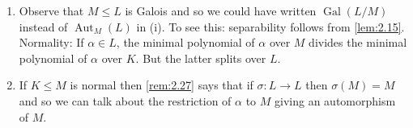 \documentclass{article}
\DeclareMathOperator{\Aut}{Aut}
\DeclareMathOperator{\Gal}{Gal}
\begin{document}
\begin{remark}
    \begin{enumerate}[label=(\roman*)]
        \item Observe that $M \leq L$ is Galois and so we could have written $\Gal(L/M)$ instead of $\Aut_M(L)$ in (i).
            To see this: separability follows from \cref{lem:2.15}.
            Normality: If $\alpha \in L$, the minimal polynomial of $\alpha$ over $M$ divides the minimal polynomial of $\alpha$ over $K$.
            But the latter splits over $L$.
        \item If $K \leq M$ is normal then \cref{rem:2.27} says that if $\sigma: L \to L$ then $\sigma(M) = M$ and so we can talk about the restriction of $\alpha$ to $M$ giving an automorphism of $M$.
    \end{enumerate}
\end{remark}
\end{document}

